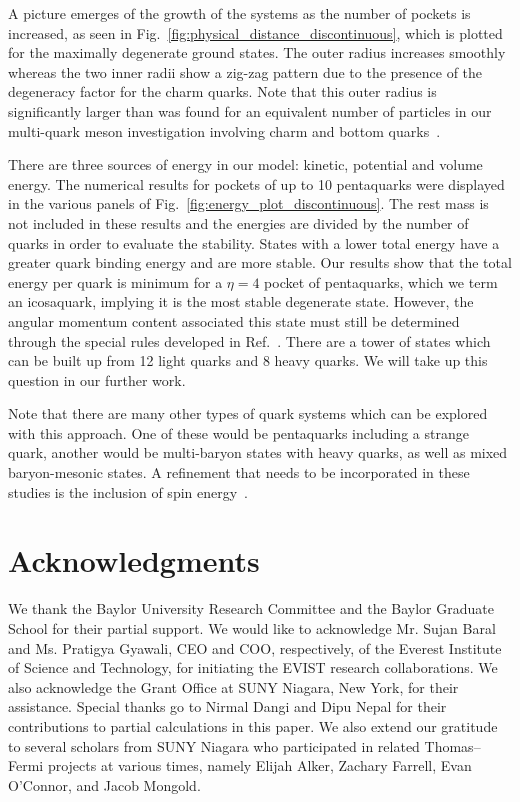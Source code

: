 \documentclass[fleqn]{article}
\begin{document}
A picture emerges of the growth of the systems as the number of pockets is increased, as seen in Fig.~\ref{fig:physical_distance_discontinuous}, which is plotted for the maximally degenerate ground states. The outer radius increases smoothly whereas the two inner radii show a zig-zag pattern due to the presence of the degeneracy factor for the charm quarks. Note that this outer radius is significantly larger than was found for an equivalent number of particles in our multi-quark meson investigation involving charm and bottom quarks~\cite{Baral:2019qpl}. 

There are three sources of energy in our model: kinetic, potential and volume energy. The numerical results for pockets of up to 10 pentaquarks were displayed in the various panels of Fig.~\ref{fig:energy_plot_discontinuous}. The rest mass is not included in these results and the energies are divided by the number of quarks in order to evaluate the stability. States with a lower total energy have a greater quark binding energy and are more stable. Our results show that the total energy per quark is minimum for a $\eta=4$ pocket of pentaquarks, which we term an icosaquark, implying it is the most stable degenerate state. However, the angular momentum content associated this state must still be determined through the special rules developed in Ref.~\cite{Liu:2012my}. There are a tower of states which can be built up from 12 light quarks and 8 heavy quarks. We will take up this question in our further work.

Note that there are many other types of quark systems which can be explored with this approach. One of these would be pentaquarks including a strange quark, another would be multi-baryon states with heavy quarks, as well as mixed baryon-mesonic states. A refinement that needs to be incorporated in these studies is the inclusion of spin energy~\cite{Liu:2012my}. 


\section{Acknowledgments}
We thank the Baylor University Research Committee and the Baylor Graduate School for their partial support.
We would like to acknowledge Mr. Sujan Baral and Ms. Pratigya Gyawali, CEO and COO, respectively, of the Everest Institute of Science and Technology, for initiating the EVIST research collaborations.
We also acknowledge the Grant Office at SUNY Niagara, New York, for their assistance.
Special thanks go to Nirmal Dangi and Dipu Nepal for their contributions to partial calculations in this paper.
We also extend our gratitude to several scholars from SUNY Niagara who participated in related Thomas–Fermi projects at various times, namely Elijah Alker, Zachary Farrell, Evan O’Connor, and Jacob Mongold.
    
    
    
\end{document}
